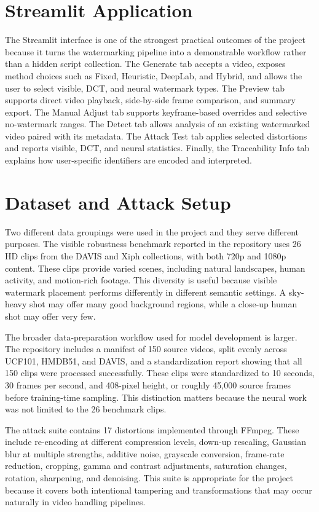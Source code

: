 \documentclass[12pt,oneside]{report}
\begin{document}
\section{Streamlit Application}
The Streamlit interface is one of the strongest practical outcomes of the project because it turns the watermarking pipeline into a demonstrable workflow rather than a hidden script collection. The Generate tab accepts a video, exposes method choices such as Fixed, Heuristic, DeepLab, and Hybrid, and allows the user to select visible, DCT, and neural watermark types. The Preview tab supports direct video playback, side-by-side frame comparison, and summary export. The Manual Adjust tab supports keyframe-based overrides and selective no-watermark ranges. The Detect tab allows analysis of an existing watermarked video paired with its metadata. The Attack Test tab applies selected distortions and reports visible, DCT, and neural statistics. Finally, the Traceability Info tab explains how user-specific identifiers are encoded and interpreted.

\section{Dataset and Attack Setup}
Two different data groupings were used in the project and they serve different purposes. The visible robustness benchmark reported in the repository uses 26 HD clips from the DAVIS and Xiph collections, with both 720p and 1080p content. These clips provide varied scenes, including natural landscapes, human activity, and motion-rich footage. This diversity is useful because visible watermark placement performs differently in different semantic settings. A sky-heavy shot may offer many good background regions, while a close-up human shot may offer very few.

The broader data-preparation workflow used for model development is larger. The repository includes a manifest of 150 source videos, split evenly across UCF101, HMDB51, and DAVIS, and a standardization report showing that all 150 clips were processed successfully. These clips were standardized to 10 seconds, 30 frames per second, and 408-pixel height, or roughly 45{,}000 source frames before training-time sampling. This distinction matters because the neural work was not limited to the 26 benchmark clips.

The attack suite contains 17 distortions implemented through FFmpeg. These include re-encoding at different compression levels, down-up rescaling, Gaussian blur at multiple strengths, additive noise, grayscale conversion, frame-rate reduction, cropping, gamma and contrast adjustments, saturation changes, rotation, sharpening, and denoising. This suite is appropriate for the project because it covers both intentional tampering and transformations that may occur naturally in video handling pipelines.
\end{document}
